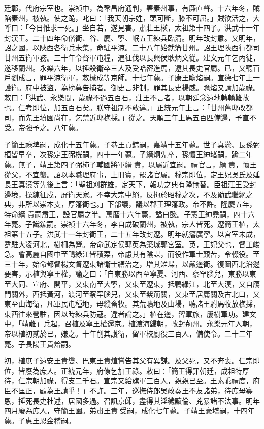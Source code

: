 廷鄣，代府宗室也。崇禎中，為鞏昌府通判，署秦州事，有廉直聲。十六年冬，賊陷秦州，被執。使之跪，叱曰：「我天朝宗姓，頭可斷，膝不可屈。」賊欲活之，大呼曰：「今日惟求一死。」坐自若，遂見害。肅莊王楧，太祖第十四子。洪武十一年封漢王。二十四年命偕衛、谷、慶、寧、岷五王練兵臨清。明年改封肅。又明年，詔之國，以陜西各衛兵未集，命駐平涼。二十八年始就籓甘州。詔王理陜西行都司甘州五衛軍務。三十年令督軍屯糧，遇征伐以長興侯耿炳文從。建文元年乞內徙，遂移蘭州。永樂六年，以捶殺衛卒三人及受哈密進馬，逮其長史官屬。已，又聽百戶劉成言，罪平涼衛軍，敕械成等京師。十七年薨。子康王瞻焰嗣。宣德七年上一護衛。府中被盜，為榜募告捕者。御史言非制，罪其長史楊威。瞻焰又請加歲祿。敕曰：「洪武、永樂間，歲祿不過五百石，莊王不言者，以朝廷念遠地轉輸難故也。仁考即位，加五百石矣。朕守祖制不敢違。」正統元年上言：「甘州舊邸改都司，而先王墳園尚在，乞禁近邸樵採。」從之。天順三年上馬五百匹備邊，予直不受。帝強予之。八年薨。

子簡王祿埤嗣，成化十五年薨。子恭王貢錝嗣，嘉靖十五年薨。世子真淤、長孫弼桓皆早卒，次孫定王弼桄嗣，四十一年薨。子縉炯先卒，孫懷王紳堵嗣，踰二年薨。無子，靖王第四子弼柿子輔國將軍縉貴，以屬近宜嗣。禮官言，縉貴，懷王從父，不宜襲。詔以本職理府事，上冊寶，罷諸官屬。穆宗即位，定王妃吳氏及延長王真滰等先後上言：「聖祖刈群雄，定天下，報功之典有隆無替。臣祖莊王受封邊境，操練征戍，屏衛天家。不幸大宗中絕，反拘於昭穆之次，不及勛武繼絕之典，非所以崇本支，厚籓衛也。」下部議，議以郡王理籓政。帝不許。隆慶五年，特命縉貴嗣肅王，設官屬之半。萬曆十六年薨，謚曰懿。子憲王紳堯嗣，四十六年薨。子識鋐嗣。崇禎十六年冬，李自成破蘭州，被執，宗人皆死。遼簡王植，太祖第十五子。洪武十一年封衛王，二十五年改封遼。明年就籓廣寧。以宮室未成，蹔駐大凌河北，樹柵為營。帝命武定侯郭英為築城郭宮室。英，王妃父也，督工峻急。會高麗自國中至鴨綠江皆積粟，帝慮其有陰謀，而役作軍士艱苦，令輟役。至三十年，始命都督楊文督遼東諸衛士繕治之，增其雉堞，以嚴邊衛。復圖西北沿邊要害，示植與寧王權，諭之曰：「自東勝以西至寧夏、河西、察罕腦兒，東勝以東至大同、宣府、開平，又東南至大寧，又東至遼東，抵鴨綠江，北至大漠，又自鴈門關外，西抵黃河，渡河至察罕腦兒，又東至紫荊關，又東至居庸關及古北口，又東至山海衛，凡軍民屯種地，毋縱畜牧。其荒曠地及山場，聽諸王駙馬牧放樵採，東西往來營駐，因以時練兵防寇。違者論之。」植在邊，習軍旅，屢樹軍功。建文中，「靖難」兵起，召植及寧王權還京。植渡海歸朝，改封荊州。永樂元年入朝，帝以植初貳於已，嫌之。十年削其護衛，留軍校廚役三百人，備使令。二十二年薨。子長陽王貴烚嗣。

初，植庶子遠安王貴燮、巴東王貴煊嘗告其父有異謀。及父死，又不奔喪。仁宗即位，皆廢為庶人。正統元年，府僚乞加王祿。敕曰：「簡王得罪朝廷，成祖特厚待，仁宗朝加祿，得支二千石。宣宗又給旗軍三百人，親親已至。王素乖禮度，府臣不匡正，顧為王請乎！」不許。三年，巡撫侍郎吳政奏王不友諸弟，待庶母寡恩，捶死長史杜述，居國多過。召訊京師，盡得其淫穢黷倫、兇暴諸不法事。明年四月廢為庶人，守簡王園。弟肅王貴受嗣，成化七年薨。子靖王豪墭嗣，十四年薨。子惠王恩金稽嗣。

